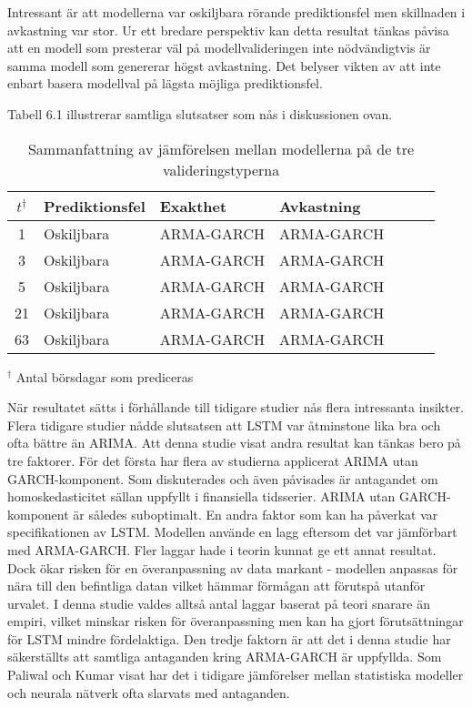 \documentclass[11pt]{article}
\numberwithin{equation}{section}
\numberwithin{table}{section}
\numberwithin{figure}{section}
\begin{document}
Intressant är att modellerna var oskiljbara rörande prediktionsfel men skillnaden i avkastning var stor. Ur ett bredare perspektiv kan detta resultat tänkas påvisa att en modell som presterar väl på modellvalideringen inte nödvändigtvis är samma modell som genererar högst avkastning. Det belyser vikten av att inte enbart basera modellval på lägsta möjliga prediktionsfel. 

Tabell 6.1 illustrerar samtliga slutsatser som nås i diskussionen ovan.

\begin{table}[H]
\caption{Sammanfattning av jämförelsen mellan modellerna på de tre valideringstyperna}

\begin{tabularx}{\textwidth}{c *{6}{Y}}
\toprule
$t ^\dagger$  & Prediktionsfel & Exakthet & Avkastning \\
\hline

1      & Oskiljbara          & ARMA-GARCH                 & ARMA-GARCH          \\
3      & Oskiljbara          & ARMA-GARCH          & ARMA-GARCH    \\

5      & Oskiljbara          & ARMA-GARCH         &ARMA-GARCH   \\

21     &  Oskiljbara         & ARMA-GARCH         & ARMA-GARCH   \\


63     & Oskiljbara         & ARMA-GARCH         & ARMA-GARCH    \\ 

\bottomrule
\end{tabularx}
\footnotesize{$^\dagger$ Antal börsdagar som prediceras}
\end{table}

När resultatet sätts i förhållande till tidigare studier nås flera intressanta insikter. Flera tidigare studier nådde slutsatsen att LSTM var åtminstone lika bra och ofta bättre än ARIMA. Att denna studie visat andra resultat kan tänkas bero på tre faktorer. För det första har flera av studierna applicerat ARIMA utan GARCH-komponent. Som diskuterades och även påvisades är antagandet om homoskedasticitet sällan uppfyllt i finansiella tidsserier. ARIMA utan GARCH-komponent är således suboptimalt. En andra faktor som kan ha påverkat var specifikationen av LSTM. Modellen använde en lagg eftersom det var jämförbart med ARMA-GARCH. Fler laggar hade i teorin kunnat ge ett annat resultat. Dock ökar risken för en överanpassning av data markant -  modellen anpassas för nära till den befintliga datan vilket hämmar förmågan att förutspå utanför urvalet. I denna studie valdes alltså antal laggar baserat på teori snarare än empiri, vilket minskar risken för överanpassning men kan ha gjort förutsättningar för LSTM mindre fördelaktiga. Den tredje faktorn är att det i denna studie har säkerställts att samtliga antaganden kring ARMA-GARCH är uppfyllda. Som Paliwal och Kumar \parencite*{paliwal2009neural} visat har det i tidigare jämförelser mellan statistiska modeller och neurala nätverk ofta slarvats med antaganden. 
\end{document}
